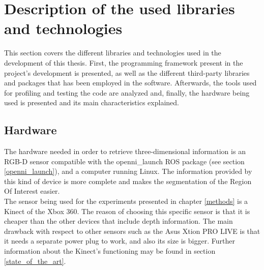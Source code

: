 \section{Description of the used libraries and technologies}
\label{libraries_and_technologies}

This section covers the different libraries and technologies used in the development of this thesis.
First, the programming framework present in the project's development is presented, as well as the different third-party libraries and packages that has been employed in the software. Afterwards, the tools used for profiling and testing the code are analyzed and, finally, the hardware being used is presented and its main characteristics explained. 




	\subsection{Hardware}
		\label{technologies_hardware}

		The hardware needed in order to retrieve three-dimensional information is an RGB-D sensor compatible with the openni\_launch ROS package (see section \ref{openni_launch}), and a computer running Linux. The information provided by this kind of device is more complete and makes the segmentation of the Region Of Interest easier. \\

		The sensor being used for the experiments presented in chapter \ref{methods} is a Kinect of the Xbox 360. The reason of choosing this specific sensor is that it is cheaper than the other devices that include depth information. The main drawback with respect to other sensors such as the Asus Xtion PRO LIVE \cite{xtion} is that it needs a separate power plug to work, and also its size is bigger. 
		Further information about the Kinect's functioning may be found in section \ref{state_of_the_art}.



